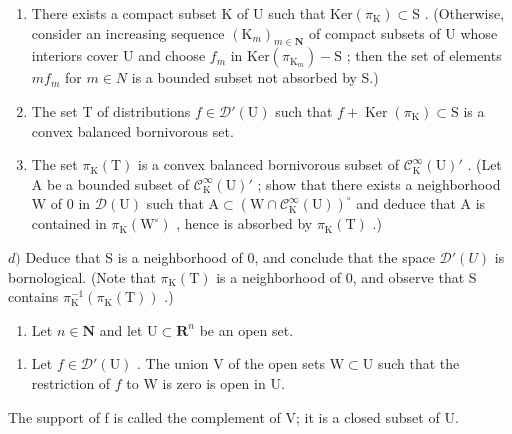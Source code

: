 \begin{enumerate}
\def\labelenumi{\alph{enumi})}
\item
  There exists a compact subset K of U such that \(\mathrm{Ker}(\pi_{\mathrm{K}}) \subset \mathrm{S}\) . (Otherwise, consider an increasing sequence \((\mathrm{K}_{m})_{m \in \mathbf{N}}\) of compact subsets of U whose interiors cover U and choose \(f_{m}\) in \(\mathrm{Ker}(\pi_{\mathrm{K}_{m}}) - \mathrm{S}\) ; then the set of elements \(mf_{m}\) for \(m \in N\) is a bounded subset not absorbed by S.)
\item
  The set T of distributions \(f \in \mathcal{D}'(\mathrm{U})\) such that \(f + \operatorname{Ker}(\pi_{\mathrm{K}}) \subset \mathrm{S}\) is a convex balanced bornivorous set.
\item
  The set \(\pi_{\mathrm{K}}(\mathrm{T})\) is a convex balanced bornivorous subset of \(\mathcal{C}_{\mathrm{K}}^{\infty}(\mathrm{U})'\) . (Let A be a bounded subset of \(\mathcal{C}_{\mathrm{K}}^{\infty}(\mathrm{U})'\) ; show that there exists a neighborhood W of 0 in \(\mathcal{D}(\mathrm{U})\) such that \(\mathrm{A} \subset (\mathrm{W} \cap \mathcal{C}_{\mathrm{K}}^{\infty}(\mathrm{U}))^{\circ}\) and deduce that A is contained in \(\pi_{\mathrm{K}}(\mathrm{W}^{\circ})\) , hence is absorbed by \(\pi_{\mathrm{K}}(\mathrm{T})\) .)
\end{enumerate}

\(d)\) Deduce that S is a neighborhood of 0, and conclude that the space \(\mathcal{D}'(U)\) is bornological. (Note that \(\pi_{\mathrm{K}}(\mathrm{T})\) is a neighborhood of 0, and observe that S contains \(\pi_{\mathrm{K}}^{-1}(\pi_{\mathrm{K}}(\mathrm{T}))\) .)

\begin{enumerate}
\def\labelenumi{\arabic{enumi})}
\setcounter{enumi}{18}
\tightlist
\item
  Let \(n \in \mathbf{N}\) and let \(\mathrm{U} \subset \mathbf{R}^n\) be an open set.
\end{enumerate}

\begin{enumerate}
\def\labelenumi{\alph{enumi})}
\tightlist
\item
  Let \(f \in \mathcal{D}'(\mathrm{U})\) . The union V of the open sets \(\mathrm{W} \subset \mathrm{U}\) such that the restriction of \(f\) to W is zero is open in U.
\end{enumerate}

The support of f is called the complement of V; it is a closed subset of U.

